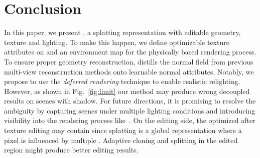 \section{Conclusion}
In this paper, we present \name, a  splatting representation with editable geometry, texture and lighting. 
To make this happen, we define optimizable texture attributes on  and an environment map for the physically based rendering process. 
To ensure proper geometry reconstruction, \name distills the normal field from previous multi-view reconstruction methods onto  learnable normal attributes. 
Notably, we propose to use the \textit{deferred rendering} technique to enable realistic relighting. 
However, as shown in Fig.~\ref{fig:limit} our method may produce wrong decoupled results on scenes with shadow. 
For future directions, it is promising to resolve the ambiguity by capturing scenes under multiple lighting conditions and introducing visibility into the rendering process like~\cite{FEGR, SOL-NeRF}. 
On the editing side, the optimized  after texture editing may contain  since  splatting is a global representation where a pixel is influenced by multiple . 
Adaptive cloning and splitting in the edited region might produce better editing results. 
